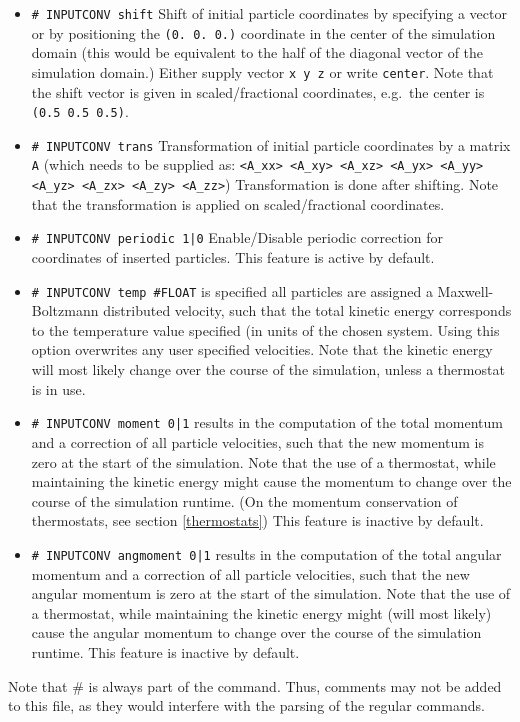 \begin{itemize}

\item {\tt \# INPUTCONV shift} Shift of initial particle coordinates by specifying a vector or by positioning the {\tt (0. 0. 0.)} 
  coordinate in the center of the simulation domain (this would be equivalent to the half of the diagonal vector of the simulation domain.) 
  Either supply vector {\tt x y z} or write {\tt center}. Note that the shift vector is given in scaled/fractional coordinates, e.g.\ the center is  {\tt (0.5 0.5 0.5)}.
\item {\tt \# INPUTCONV trans} Transformation of initial particle coordinates by a matrix {\tt A} (which needs to be supplied as: 
  {\tt <A\_xx> <A\_xy> <A\_xz>  <A\_yx> <A\_yy> <A\_yz>  <A\_zx> <A\_zy> <A\_zz>}) Transformation is done after shifting. Note that the transformation is applied on scaled/fractional coordinates.
\item {\tt \# INPUTCONV periodic 1|0} Enable/Disable periodic correction for coordinates of inserted particles.
  This feature is active by default.
\item {\tt \# INPUTCONV temp \#FLOAT} is specified all particles are assigned a Maxwell-Boltzmann distributed velocity, 
  such that the total kinetic energy corresponds to the temperature value specified (in units of the chosen system. 
  Using this option overwrites any user specified velocities. Note that the kinetic energy will most likely change over 
  the course of the simulation, unless a thermostat is in use.
\item {\tt \# INPUTCONV moment 0|1} results in the computation of the total momentum and a correction of all particle velocities,
  such that the new momentum is zero at the start of the simulation. Note that the use of a thermostat, 
  while maintaining the kinetic energy might cause the momentum to change over the course of the simulation runtime. 
  (On the momentum conservation of thermostats, see section \ref{thermostats}) This feature is inactive by default.
\item {\tt \# INPUTCONV angmoment 0|1} results in the computation of the total angular momentum and a correction of all particle velocities, 
  such that the new angular momentum is zero at the start of the simulation. Note that the use of a thermostat, 
  while maintaining the kinetic energy might (will most likely) cause the angular momentum to change over the course of the simulation runtime. This feature is inactive by default.
\end{itemize}
Note that \# is always part of the command. Thus, comments may not be added to this file, as they would interfere with the parsing of the regular commands.


